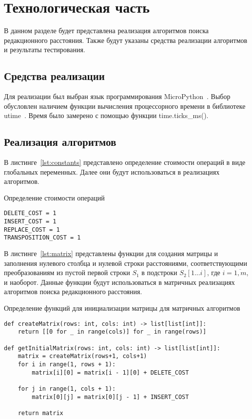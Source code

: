 \section{Технологическая часть}

В данном разделе будет представлена реализация алгоритмов поиска редакционного расстояния. Также будут указаны средства реализации алгоритмов и результаты тестирования.

\subsection{Средства реализации}

Для реализации был выбран язык программирования MicroPython~\cite{python}. Выбор обусловлен наличием функции вычисления процессорного времени в библиотеке utime~\cite{time}. Время было замерено с помощью функции time.ticks\_ms().

\subsection{Реализация алгоритмов}

В листинге~\ref{lst:constants} представлено определение стоимости операций в виде глобальных переменных. Далее они будут использоваться в реализациях алгоритмов.
 
\begin{listing}[H]
\caption{Определение стоимости операций}
\label{lst:constants}
\begin{verbatim}
DELETE_COST = 1
INSERT_COST = 1
REPLACE_COST = 1
TRANSPOSITION_COST = 1
\end{verbatim}
\end{listing}

В листинге~\ref{lst:matrix} представлены функции для создания матрицы и заполнения нулевого столбца и нулевой строки расстояниями, соответствующими преобразованиям из пустой первой строки \(S_1\) в подстроки \(S_2[1...i]\), где \(i = \overline{1,m}\), и наоборот. Данные функции будут использоваться в матричных реализациях алгоритмов поиска редакционного расстояния.
 
\begin{listing}
\caption{Определение функций для инициализации матрицы для матричных алгоритмов}
\label{lst:matrix}
\begin{verbatim}
def createMatrix(rows: int, cols: int) -> list[list[int]]:
    return [[0 for _ in range(cols)] for _ in range(rows)]

def getInitialMatrix(rows: int, cols: int) -> list[list[int]]:
    matrix = createMatrix(rows+1, cols+1)
    for i in range(1, rows + 1):
        matrix[i][0] = matrix[i - 1][0] + DELETE_COST

    for j in range(1, cols + 1):
        matrix[0][j] = matrix[0][j - 1] + INSERT_COST

    return matrix
\end{verbatim}
\end{listing}

